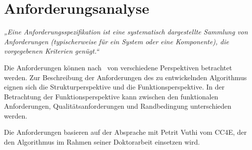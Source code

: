 \chapter{Anforderungsanalyse}
\textit{„Eine Anforderungsspezifikation ist eine systematisch dargestellte Sammlung von Anforderungen (typischerweise für ein System oder eine Komponente), die vorgegebenen Kriterien genügt.“} \cite{Anf-Spec}

Die Anforderungen können nach~\cite{Anf-Spec} von verschiedene Perspektiven betrachtet werden. Zur Beschreibung der Anforderungen des zu entwickelnden Algorithmus eignen sich die Strukturperspektive und die Funktionsperspektive. In der Betrachtung der Funktionsperspektive kann zwischen den funktionalen Anforderungen, Qualitätsanforderungen und Randbedingung unterschieden werden.

Die Anforderungen basieren auf der Absprache mit Petrit Vuthi vom CC4E, der den Algorithmus im Rahmen seiner Doktorarbeit einsetzen wird.

